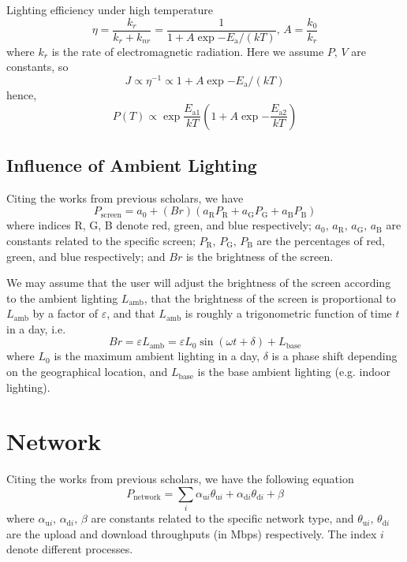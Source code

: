 \documentclass[12pt]{article}
\begin{document}
Lighting efficiency under high temperature
\begin{equation}
	\eta=\frac{k_r}{k_r+k_{nr}}=\frac{1}{1+A\exp{-E_\mathrm {a}/(kT)}},\,A=\frac{k_0}{k_r}
\end{equation}
where $k_r$ is the rate of electromagnetic radiation. Here we assume $P,\,V$ are constants, so
\begin{equation}
	J\propto \eta^{-1}\propto 1+A\exp{-E_\mathrm {a}/(kT)}
\end{equation}
hence, 
\begin{equation}
	P(T)\propto \exp{\frac{E_\mathrm{a1}}{kT}}\left(1+A\exp{-\frac{E_\mathrm {a2}}{kT}}\right)
\end{equation}

\subsection{Influence of Ambient Lighting}

Citing the works from previous scholars, we have
\begin{equation}
	P_\mathrm{screen}=a_0+(Br)(a_\mathrm RP_\mathrm R+a_\mathrm GP_\mathrm G+a_\mathrm BP_\mathrm B)
\end{equation}
where indices R, G, B denote red, green, and blue respectively; $a_0,\,a_\mathrm R,\,a_\mathrm G,\,a_\mathrm B$ are constants related to the specific screen; $P_\mathrm R,\,P_\mathrm G,\,P_\mathrm B$ are the percentages of red, green, and blue respectively; and $Br$ is the brightness of the screen.

We may assume that the user will adjust the brightness of the screen according to the ambient lighting $L_\mathrm{amb}$, that the brightness of the screen is proportional to $L_\mathrm{amb}$ by a factor of $\varepsilon$, and that $L_\mathrm{amb}$ is roughly a trigonometric function of time $t$ in a day, i.e.
\begin{equation}
	Br=\varepsilon L_\mathrm{amb}=\varepsilon L_0\sin{\left(\omega t+\delta\right)}+L_\mathrm{base}
\end{equation}
where $L_0$ is the maximum ambient lighting in a day, $\delta$ is a phase shift depending on the geographical location, and $L_\mathrm{base}$ is the base ambient lighting (e.g. indoor lighting).

\section{Network}

Citing the works from previous scholars, we have the following equation
\begin{equation}
	P_{\mathrm {network}}=\sum_i \alpha_{\mathrm ui}\theta_{\mathrm ui}+\alpha_{\mathrm di}\theta_{\mathrm di}+\beta
\end{equation}
where $\alpha_{\mathrm ui},\,\alpha_{\mathrm di},\,\beta$ are constants related to the specific network type, and $\theta_{\mathrm ui},\,\theta_{\mathrm di}$ are the upload and download throughputs (in Mbps) respectively. The index $i$ denote different processes.
\end{document}
